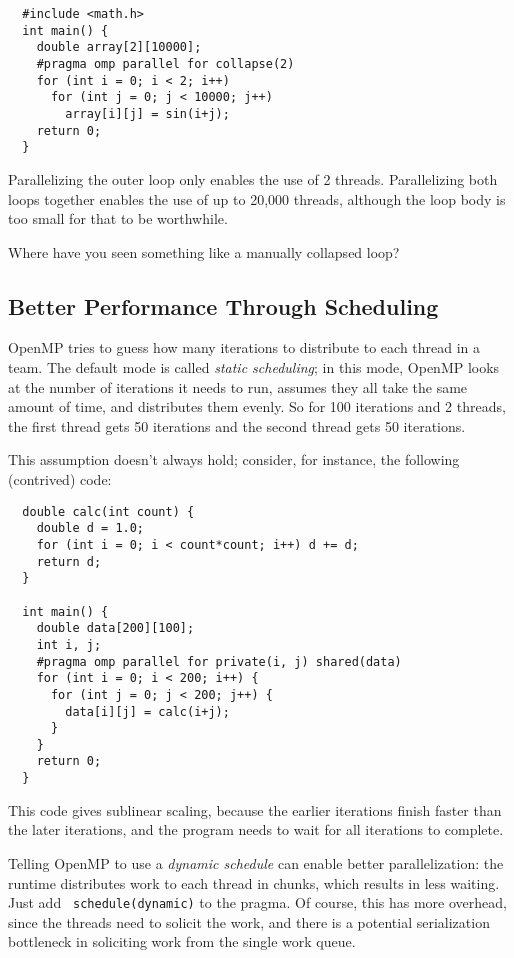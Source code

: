 {\small
\begin{verbatim}
  #include <math.h>
  int main() {
    double array[2][10000];
    #pragma omp parallel for collapse(2)
    for (int i = 0; i < 2; i++)
      for (int j = 0; j < 10000; j++)
        array[i][j] = sin(i+j);
    return 0;
  }
\end{verbatim}
}

Parallelizing the outer loop only enables the use of 2 threads.
Parallelizing both loops together enables the use of up to 20,000
threads, although the loop body is too small for that to be
worthwhile. 

{\sf Where have you seen something like a manually collapsed loop?}\\[1em]

\subsection*{Better Performance Through Scheduling}
OpenMP tries to guess how many iterations to distribute to each thread
in a team. The default mode is called \emph{static scheduling}; in
this mode, OpenMP looks at the number of iterations it needs to run,
assumes they all take the same amount of time, and distributes them
evenly. So for 100 iterations and 2 threads, the first thread gets 50
iterations and the second thread gets 50 iterations.

This assumption doesn't always hold; consider, for instance, the 
following (contrived) code:
{\small
\begin{verbatim}
  double calc(int count) {
    double d = 1.0;
    for (int i = 0; i < count*count; i++) d += d;
    return d;
  }

  int main() {
    double data[200][100];
    int i, j;
    #pragma omp parallel for private(i, j) shared(data)
    for (int i = 0; i < 200; i++) {
      for (int j = 0; j < 200; j++) {
        data[i][j] = calc(i+j);
      }
    }
    return 0;
  }
\end{verbatim}
}
This code gives sublinear scaling, because the earlier iterations 
finish faster than the later iterations, and the program needs to wait
for all iterations to complete.

Telling OpenMP to use a \emph{dynamic schedule} can enable better
parallelization: the runtime distributes work to each thread in
chunks, which results in less waiting. Just add {\tt
  schedule(dynamic)} to the pragma. Of course, this has more overhead,
since the threads need to solicit the work, and there is a potential
serialization bottleneck in soliciting work from the single work
queue. 

